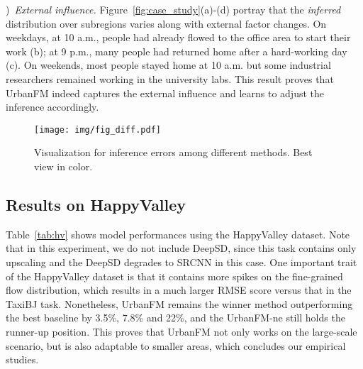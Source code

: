 )~\textit{External influence.} Figure~\ref{fig:case_study}(a)-(d) portray that the \textit{inferred} distribution over subregions varies along with external factor changes. On weekdays, at 10 a.m., people had already flowed to the office area to start their work (b); at 9 p.m., many people had returned home after a hard-working day (c). On weekends, most people stayed home at 10 a.m. but some industrial researchers remained working in the university labs. This result proves that UrbanFM indeed captures the external influence and learns to adjust the inference accordingly.

\begin{figure}[!t]
	\centering
	\texttt{[image: img/fig\_diff.pdf]}
	\vspace{-1em}
	\caption{\label{fig:diff} Visualization for inference errors among different methods. Best view in color.}	
	\vspace{-1em}
\end{figure}


\subsection{Results on HappyValley}
Table~\ref{tab:hv} shows model performances using the HappyValley dataset. Note that in this experiment, we do not include DeepSD, since this task contains only  upscaling and the DeepSD degrades to SRCNN in this case. One important trait of the HappyValley dataset is that it contains more spikes on the fine-grained flow distribution, which results in a much larger RMSE score versus that in the TaxiBJ task. Nonetheless, UrbanFM remains the winner method outperforming the best baseline by 3.5\%, 7.8\% and 22\%, and the UrbanFM-ne still holds the runner-up position. This proves that UrbanFM not only works on the large-scale scenario, but is also adaptable to smaller areas, which concludes our empirical studies.

